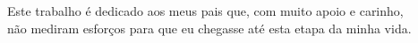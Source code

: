 
Este trabalho é dedicado aos meus pais que, com muito apoio e carinho, \\
não mediram esforços para que eu chegasse até esta etapa da minha vida.
